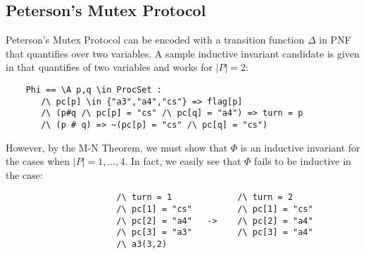\documentclass[12pt]{article}
\theoremstyle{definition}
\theoremstyle{remark}
\begin{document}
\subsection{Peterson's Mutex Protocol}
Peterson's Mutex Protocol can be encoded with a transition function $\Delta$ in PNF that quantifies over two variables.  A sample inductive invariant candidate is given in \cite{ian-peterson} that quantifies of two variables and works for $|P|=2$:
\begin{verbatim}
    Phi == \A p,q \in ProcSet :
       /\ pc[p] \in {"a3","a4","cs"} => flag[p]
       /\ (p#q /\ pc[p] = "cs" /\ pc[q] = "a4") => turn = p
       /\ (p # q) => ~(pc[p] = "cs" /\ pc[q] = "cs")
\end{verbatim}
However, by the M-N Theorem, we must show that $\Phi$ is an inductive invariant for the cases when $|P|=1,...,4$.  In fact, we easily see that $\Phi$ fails to be inductive in the case:
\begin{verbatim}
                      /\ turn = 1             /\ turn = 2
                      /\ pc[1] = "cs"         /\ pc[1] = "cs"
                      /\ pc[2] = "a4"   ->    /\ pc[2] = "a4"
                      /\ pc[3] = "a3"         /\ pc[3] = "a4"
                      /\ a3(3,2)
\end{verbatim}




\end{document}
